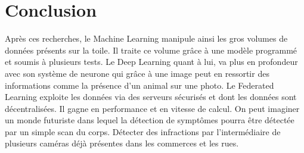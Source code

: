\documentclass[12pt,a4paper,french]{report}
\begin{document}
\chapter{Conclusion}

Après ces recherches, le Machine Learning manipule ainsi les gros volumes de données présents sur la toile. Il traite ce volume grâce à une modèle programmé et soumis à plusieurs tests. Le Deep Learning quant à lui, va plus en profondeur avec son système de neurone qui grâce à une image peut en ressortir des informations comme la présence d'un animal sur une photo. Le Federated Learning exploite les données via des serveurs sécurisés et dont les données sont décentralisées. Il gagne en performance et en vitesse de calcul. On peut imaginer un monde futuriste dans lequel la détection de symptômes pourra être détectée par un simple scan du corps. Détecter des infractions par l'intermédiaire de plusieurs caméras déjà présentes dans les commerces et les rues.  
\end{document}
